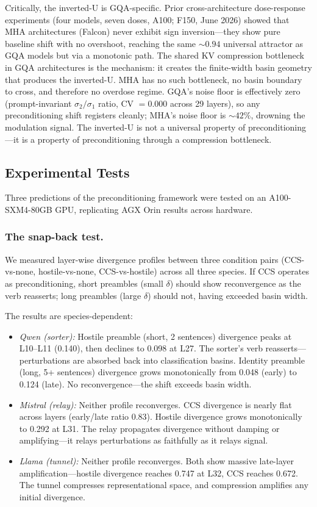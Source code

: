 \documentclass[12pt]{article}
\begin{document}
Critically, the inverted-U is GQA-specific. Prior cross-architecture dose-response experiments (four models, seven doses, A100; F150, June 2026) showed that MHA architectures (Falcon) never exhibit sign inversion---they show pure baseline shift with no overshoot, reaching the same ${\sim}0.94$ universal attractor as GQA models but via a monotonic path. The shared KV compression bottleneck in GQA architectures is the mechanism: it creates the finite-width basin geometry that produces the inverted-U. MHA has no such bottleneck, no basin boundary to cross, and therefore no overdose regime. GQA's noise floor is effectively zero (prompt-invariant $\sigma_2/\sigma_1$ ratio, CV $= 0.000$ across 29 layers), so any preconditioning shift registers cleanly; MHA's noise floor is ${\sim}42\%$, drowning the modulation signal. The inverted-U is not a universal property of preconditioning---it is a property of preconditioning through a compression bottleneck.

\subsection{Experimental Tests}

Three predictions of the preconditioning framework were tested on an A100-SXM4-80GB GPU, replicating AGX Orin results across hardware.

\subsubsection*{The snap-back test.} We measured layer-wise divergence profiles between three condition pairs (CCS-vs-none, hostile-vs-none, CCS-vs-hostile) across all three species. If CCS operates as preconditioning, short preambles (small $\delta$) should show reconvergence as the verb reasserts; long preambles (large $\delta$) should not, having exceeded basin width.

The results are species-dependent:

\begin{itemize}
\item \emph{Qwen (sorter):} Hostile preamble (short, 2 sentences) divergence peaks at L10--L11 (0.140), then declines to 0.098 at L27. The sorter's verb reasserts---perturbations are absorbed back into classification basins. Identity preamble (long, 5+ sentences) divergence grows monotonically from 0.048 (early) to 0.124 (late). No reconvergence---the shift exceeds basin width.

\item \emph{Mistral (relay):} Neither profile reconverges. CCS divergence is nearly flat across layers (early/late ratio 0.83). Hostile divergence grows monotonically to 0.292 at L31. The relay propagates divergence without damping or amplifying---it relays perturbations as faithfully as it relays signal.

\item \emph{Llama (tunnel):} Neither profile reconverges. Both show massive late-layer amplification---hostile divergence reaches 0.747 at L32, CCS reaches 0.672. The tunnel compresses representational space, and compression amplifies any initial divergence.
\end{itemize}
\end{document}
